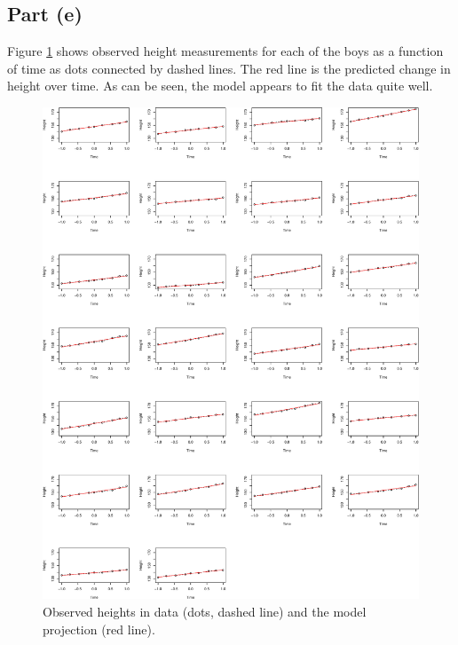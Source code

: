 \documentclass[
]{homework}
\begin{document}
\subsection{Part (e)}\label{part-e-2}

Figure \ref{fig:ex5-final-fig} shows observed height measurements for each of the boys as a function of time as dots connected by dashed lines.
The red line is the predicted change in height over time. As can be seen, the model appears to fit the data quite well.

\begin{figure}

{\centering \includegraphics[width=1\linewidth]{finalexam_files/figure-latex/ex5-final-fig-1} 

}

\caption{Observed heights in data (dots, dashed line) and the model projection (red line).}\label{fig:ex5-final-fig}
\end{figure}
\end{document}
